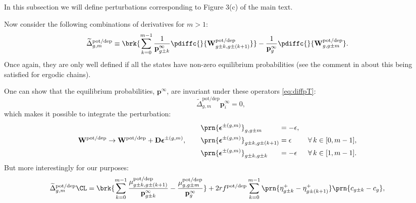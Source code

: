 \documentclass{article} %
\newcommand{\pr}{\mathbf{p}}
\newcommand{\eq}{\pr^\infty}
\newcommand{\D}{\mathbf{D}}
\newcommand{\W}{\mathbf{W}}
\newcommand{\potdep}{^{\text{pot/dep}}}
\begin{document}
In this subsection we will define perturbations corresponding to Figure 3(c) of the main text.

Now consider the following combinations of derivatives for $m>1$:
%
\begin{align}
\label{eq:shortcutderiv}
    \widetilde{\Delta}\potdep _{g,m} &\equiv
      \brk{ \sum_{k=0}^{m-1} \frac{1}{\eq_{g\pm k}} \pdiffc{}{\W\potdep _{g\pm k,g\pm(k+1)}} }
      - \frac{1}{\eq_g} \pdiffc{}{\W\potdep _{g,g\pm m}}.
\end{align}
%
Once again, they are only well defined if all the states have non-zero equilibrium probabilities (see the comment in  about this being satisfied for ergodic chains).

One can show that the equilibrium probabilities, $\eq$, are invariant under these operators \eqref{eq:diffpT}:
%
\begin{equation}\label{eq:shortcutprob}
  \widetilde{\Delta}\potdep _{g,m} \eq_i = 0,
\end{equation}
%
which makes it possible to integrate the perturbation:
%
\begin{equation}\label{eq:shortcutfinite}
  \W\potdep  \to \W\potdep  + \D\boldsymbol{\epsilon}^{\pm(g,m)},
  \qquad
  \begin{aligned}
    &\prn{\boldsymbol{\epsilon}^{\pm(g,m)}}_{g,g\pm m}
      &\!\!\!\!\!\!&= -\epsilon,\\
    &\prn{\boldsymbol{\epsilon}^{\pm(g,m)}}_{g\pm k,g\pm(k+1)}
      &\!\!\!\!\!\!&= \epsilon
        &\;
        &\forall\, k \in [0,m-1],\\
    &\prn{\boldsymbol{\epsilon}^{\pm(g,m)}}_{g\pm k,g\pm k}
      &\!\!\!\!\!\!&= -\epsilon
        &
        &\forall\, k \in [1,m-1].
  \end{aligned}
\end{equation}
%
But more interestingly for our purposes:
%
\begin{align}
\label{eq:shortcutarea}
    \widetilde{\Delta}\potdep _{g,m}\CL &=
      \brk{ \sum_{k=0}^{m-1} \frac{\mu\potdep _{g\pm k,g\pm(k+1)}}{\eq_{g\pm k}}
      - \frac{\mu\potdep _{g,g\pm m}}{\eq_g}}
      + 2rf\potdep  \sum_{k=0}^{m-1} \prn{\eta^+_{g\pm k} - \eta^+_{g\pm(k+1)}} \prn{c_{g\pm k} - c_{g}},
\end{align}
%
\end{document}
